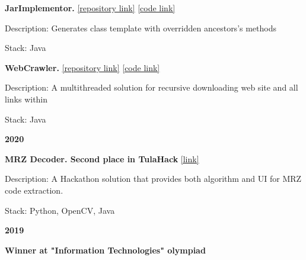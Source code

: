 \documentclass[11pt,a4paper]{report}
\begin{document}
\hspace{10px} \textbf{JarImplementor.} \href{https://github.com/Kvel4/java-advanced}{[repository link]} \href{https://github.com/Kvel4/java-advanced/tree/master/java-solutions/info/kgeorgiy/ja/monakhov/implementor}{[code link]}

\hspace{20px} Description: Generates class template with overridden ancestors's methods

\hspace{20px} Stack: Java

\vspace{10px}


\hspace{10px} \textbf{WebCrawler.} \href{https://github.com/Kvel4/java-advanced}{[repository link]} \href{https://github.com/Kvel4/java-advanced/tree/master/java-solutions/info/kgeorgiy/ja/monakhov/crawler}{[code link]}

\hspace{20px} Description: A multithreaded solution for recursive downloading web site and all links within

\hspace{20px} Stack: Java

\vspace{10px}


\textbf{\Large{2020}}

\hspace{10px} \textbf{MRZ Decoder. Second place in TulaHack} \href{https://github.com/Kvel4/MRZ_codes}{[link]}

\hspace{20px} Description: A Hackathon solution that provides both algorithm and UI for
MRZ code extraction.
 
\hspace{20px} Stack: Python, OpenCV, Java
\vspace{10px}



\textbf{\Large{2019}}

\hspace{10px} \textbf{Winner at "Information Technologies" olympiad}
\end{document}
